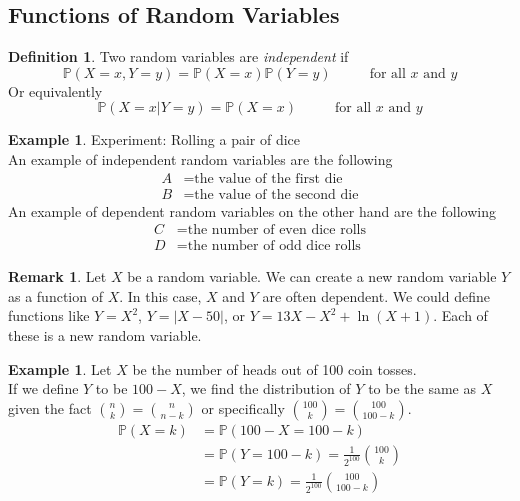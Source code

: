 \documentclass[12pt]{article}
\newcommand{\bbP}{\mathbb{P}}
\renewcommand{\_}[1]{\underline{ #1 }}
\theoremstyle{definition}
\newtheorem{definition}[theorem]{Definition}
\newtheorem{example}[theorem]{Example}
\newtheorem{remark}[theorem]{Remark}
\numberwithin{equation}{subsection}
\begin{document}
\subsection{Functions of Random Variables}

\begin{definition}
	Two random variables are \emph{independent} if \[ \bbP(X=x, Y=y)=\bbP(X=x)\bbP(Y=y)\hspace{1cm} \text{ for all } x \text{ and } y\]
	Or equivalently
	\[ \bbP(X=x | Y=y)=\bbP(X=x)\hspace{1cm} \text{ for all } x \text{ and } y\]
\end{definition}

\begin{example}
	Experiment: Rolling a pair of dice \\
	An example of independent random variables are the following
	\begin{align*}
		A&=\text{the value of the first die} \\
		B&=\text{the value of the second die} 
	\end{align*}
	An example of dependent random variables on the other hand are the following
	\begin{align*}
		C&=\text{the number of even dice rolls} \\
		D&=\text{the number of odd dice rolls}
	\end{align*}
\end{example}

\begin{remark}
	Let $X$ be a random variable. We can create a new random variable $Y$ as a function of $X$. In this case, $X$ and $Y$ are often dependent. We could define functions like $Y=X^2$, $Y=|X-50|$, or $Y=13X-X^2+\ln(X+1)$. Each of these is a new random variable.
\end{remark}

\begin{example}
Let $X$ be the number of heads out of 100 coin tosses. \\
If we define $Y$ to be $100-X$, we find the distribution of $Y$ to be the same as $X$ given the fact ${n\choose k}={n\choose n-k}$ or specifically ${100\choose k}={100\choose 100-k}$. \\
\begin{align*}
	\bbP(X=k)&=\bbP(100-X=100-k) \\
	&=\bbP(Y=100-k)=\frac{1}{2^{100}}{100 \choose k}  \\
	&=\bbP(Y=k)=\frac{1}{2^{100}}{100 \choose 100-k} 
\end{align*}
\end{example}
\end{document}
